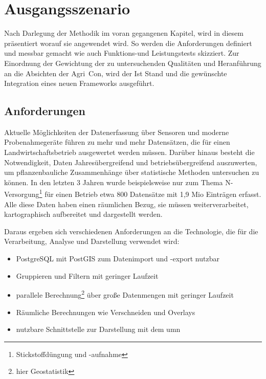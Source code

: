 \chapter{Ausgangsszenario}
\label{chapter:ausgangsszenario}
Nach Darlegung der Methodik im voran gegangenen Kapitel, wird in diesem präsentiert worauf sie angewendet wird.
So werden die Anforderungen definiert und messbar gemacht wie auch Funktions-und Leistungstests skizziert.
Zur Einordnung der Gewichtung der zu untersuchenden Qualitäten und Heranführung an die Absichten der Agri~Con, wird der Ist Stand und die gewünschte Integration eines neuen Frameworks ausgeführt.

\section{Anforderungen}
\label{Anforderungen}

Aktuelle Möglichkeiten der Datenerfassung über Sensoren und moderne Probenahmegeräte führen zu mehr und mehr Datensätzen, die für einen Landwirtschaftsbetrieb ausgewertet werden müssen. Darüber hinaus besteht die Notwendigkeit, Daten Jahresübergreifend und betriebsübergreifend auszuwerten, um pflanzenbauliche Zusammenhänge über statistische Methoden untersuchen zu können.
In den letzten 3 Jahren wurde beispielsweise nur zum Thema N-Versorgung\footnote{Stickstoffdüngung und -aufnahme} für einen Betrieb etwa 800 Datensätze mit 1,9 Mio Einträgen erfasst. Alle diese Daten haben einen räumlichen Bezug, sie müssen weiterverarbeitet, kartographisch aufbereitet und dargestellt werden.

Daraus ergeben sich verschiedenen Anforderungen an die Technologie, die für die Verarbeitung, Analyse und Darstellung verwendet wird:
\begin{itemize}
\item PostgreSQL mit PostGIS zum Datenimport und -export nutzbar
\item Gruppieren und Filtern mit geringer Laufzeit
\item parallele Berechnung\footnote{hier Geostatistik} über große Datenmengen mit geringer Laufzeit
\item Räumliche Berechnungen wie Verschneiden und Overlays
\item nutzbare Schnittstelle zur Darstellung mit dem \Gls{umn}
\end{itemize}

